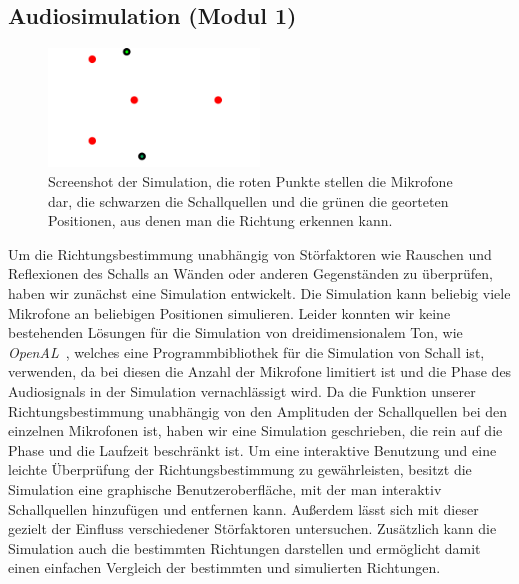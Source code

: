 \subsection{Audiosimulation (Modul 1)}
\begin{figure}
    \centering
    \includegraphics[width=0.5\textwidth]{img/bildsimulation}
    \caption{Screenshot der Simulation, die roten Punkte stellen die Mikrofone dar, die schwarzen die Schallquellen und die grünen die georteten Positionen, aus denen man die Richtung erkennen kann.}
\end{figure}
Um die Richtungsbestimmung unabhängig von Störfaktoren wie Rauschen und Reflexionen des Schalls an Wänden oder anderen Gegenständen zu überprüfen, haben wir zunächst eine Simulation entwickelt. Die Simulation kann beliebig viele Mikrofone an beliebigen Positionen simulieren. Leider konnten wir keine bestehenden Lösungen für die Simulation von dreidimensionalem Ton, wie \textit{OpenAL}~\cite{OpenAL}, welches eine Programmbibliothek für die Simulation von Schall ist, verwenden, da bei diesen die Anzahl der Mikrofone limitiert ist und die Phase des Audiosignals in der Simulation vernachlässigt wird. Da die Funktion unserer Richtungsbestimmung unabhängig von den Amplituden der Schallquellen bei den einzelnen Mikrofonen ist, haben wir eine Simulation geschrieben, die rein auf die Phase und die Laufzeit beschränkt ist. Um eine interaktive Benutzung und eine leichte Überprüfung der Richtungsbestimmung zu gewährleisten, besitzt die Simulation eine graphische Benutzeroberfläche, mit der man interaktiv Schallquellen hinzufügen und entfernen kann. Außerdem lässt sich mit dieser gezielt der Einfluss verschiedener Störfaktoren untersuchen. Zusätzlich kann die Simulation auch die bestimmten Richtungen darstellen und ermöglicht damit einen einfachen Vergleich der bestimmten und simulierten Richtungen.


